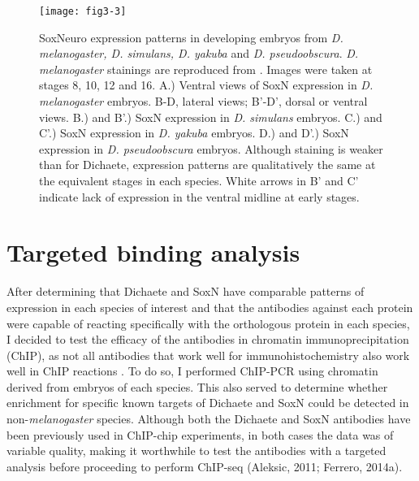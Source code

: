 \begin{figure}
\centering
\texttt{[image: fig3-3]}
\caption{SoxNeuro expression patterns in developing embryos from \emph{D. melanogaster, D. simulans, D. yakuba} and \emph{D. pseudoobscura}. \emph{D. melanogaster} stainings are reproduced from \citet{buescher_formation_2002}. Images were taken at stages 8, 10, 12 and 16. A.) Ventral views of SoxN expression in \emph{D. melanogaster} embryos. B-D, lateral views; B'-D', dorsal or ventral views. B.) and B'.) SoxN expression in \emph{D. simulans} embryos. C.) and C'.) SoxN expression in \emph{D. yakuba} embryos. D.) and D'.) SoxN expression in \emph{D. pseudoobscura} embryos. Although staining is weaker than for Dichaete, expression patterns are qualitatively the same at the equivalent stages in each species. White arrows in B' and C' indicate lack of expression in the ventral midline at early stages.}
\label{Figure 3.3}
\end{figure}

\section{Targeted binding analysis}
After determining that Dichaete and SoxN have comparable patterns of expression in each species of interest and that the antibodies against each protein were capable of reacting specifically with the orthologous protein in each species, I decided to test the efficacy of the antibodies in chromatin immunoprecipitation (ChIP), as not all antibodies that work well for immunohistochemistry also work well in ChIP reactions \citep{landt_chip-seq_2012}. To do so, I performed ChIP-PCR using chromatin derived from embryos of each species. This also served to determine whether enrichment for specific known targets of Dichaete and SoxN could be detected in non-\emph{melanogaster} species. Although both the Dichaete and SoxN antibodies have been previously used in ChIP-chip experiments, in both cases the data was of variable quality, making it worthwhile to test the antibodies with a targeted analysis before proceeding to perform ChIP-seq (Aleksic, 2011; Ferrero, 2014a).\\

